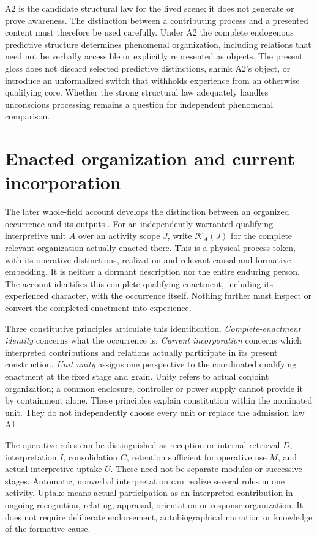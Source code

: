 A2 is the candidate structural law for the lived scene; it does not generate or prove awareness. The distinction between a contributing process and a presented content must therefore be used carefully. Under A2 the complete endogenous predictive structure determines phenomenal organization, including relations that need not be verbally accessible or explicitly represented as objects. The present gloss does not discard selected predictive distinctions, shrink A2's object, or introduce an unformalized switch that withholds experience from an otherwise qualifying core. Whether the strong structural law adequately handles unconscious processing remains a question for independent phenomenal comparison.

\section{Enacted organization and current incorporation}\label{sec:enacted-incorporation}
The later whole-field account develops the distinction between an organized occurrence and its outputs \cite{RodgersWholeField2026}. For an independently warranted qualifying interpretive unit $A$ over an activity scope $J$, write $\mathcal K_A(J)$ for the complete relevant organization actually enacted there. This is a physical process token, with its operative distinctions, realization and relevant causal and formative embedding. It is neither a dormant description nor the entire enduring person. The account identifies this complete qualifying enactment, including its experienced character, with the occurrence itself. Nothing further must inspect or convert the completed enactment into experience.

Three constitutive principles articulate this identification. \emph{Complete-enactment identity} concerns what the occurrence is. \emph{Current incorporation} concerns which interpreted contributions and relations actually participate in its present construction. \emph{Unit unity} assigns one perspective to the coordinated qualifying enactment at the fixed stage and grain. Unity refers to actual conjoint organization; a common enclosure, controller or power supply cannot provide it by containment alone. These principles explain constitution within the nominated unit. They do not independently choose every unit or replace the admission law A1.

The operative roles can be distinguished as reception or internal retrieval $D$, interpretation $I$, consolidation $C$, retention sufficient for operative use $M$, and actual interpretive uptake $U$. These need not be separate modules or successive stages. Automatic, nonverbal interpretation can realize several roles in one activity. Uptake means actual participation as an interpreted contribution in ongoing recognition, relating, appraisal, orientation or response organization. It does not require deliberate endorsement, autobiographical narration or knowledge of the formative cause.


